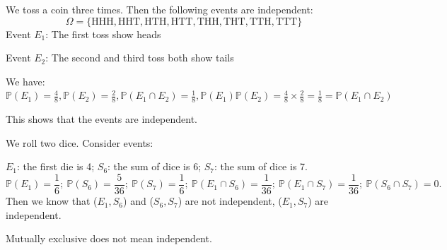 \begin{eg}
    We toss a coin three times. Then the following events are independent: 
    \[
        \Omega = \{\text{HHH}, \text{HHT}, \text{HTH}, \text{HTT}, \text{THH}, \text{THT}, \text{TTH}, \text{TTT}\}
    \]
    Event \(E_1\): The first toss show heads 

    Event \(E_2\): The second and third toss both show tails 
    
    We have: 
    \(\mathbb{P}(E_1) = \frac{4}{8}, \mathbb{P}(E_2) = \frac{2}{8}, \mathbb{P}(E_1 \cap E_2) = \frac{1}{8}, \mathbb{P}(E_1)\mathbb{P}(E_2) = \frac{4}{8} \times \frac{2}{8} = \frac{1}{8} = \mathbb{P}(E_1 \cap E_2)\)

    This shows that the events are independent.
\end{eg}

\begin{eg}
    We roll two dice. Consider events:
    
    \(E_1\): the first die is 4; \(S_6\): the sum of dice is 6; \(S_7\): the sum of dice is 7. 
    \[
    \mathbb{P}(E_1) = \dfrac{1}{6};\ \mathbb{P}(S_6) = \dfrac{5}{36};\ \mathbb{P}(S_7) = \dfrac{1}{6};\ \mathbb{P}(E_1 \cap S_6) = \dfrac{1}{36};\ \mathbb{P}(E_1 \cap S_7) = \dfrac{1}{36};\ \mathbb{P}(S_6 \cap S_7) = 0. 
    \]
    Then we know that (\(E_1, S_6\)) and (\(S_6, S_7\)) are not independent, (\(E_1, S_7\)) are independent.
    \begin{remark}
        Mutually exclusive does not mean independent. 
    \end{remark}
\end{eg}

